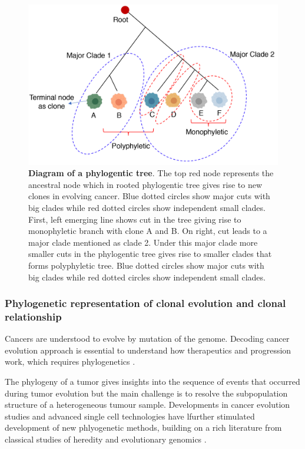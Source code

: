  \begin{figure}
\centering
\includegraphics[width=\textwidth]{Figures/chap1/phylogenetictree.png}
	\caption[Diagram of a phylogentic tree]
	{\small
	    \textbf{Diagram of a phylogentic tree}.
	 The top red node represents the ancestral node which in rooted phylogentic tree gives rise to new clones in evolving cancer.  Blue dotted circles show major cuts with big clades while red dotted circles show independent small clades. First, left emerging line shows cut in the tree giving rise to monophyletic branch with clone A and B. On right, cut leads to a major clade mentioned as clade 2. Under this major clade more smaller cuts in the phylogentic tree gives rise to smaller clades that forms polyphyletic tree. Blue dotted circles show major cuts with big clades while red dotted circles show independent small clades.
	}
	\label{fig:phylogentictree}
\end{figure}
 \subsubsection{Phylogenetic representation of clonal evolution and clonal relationship}
Cancers are understood to evolve by mutation of the genome. Decoding cancer evolution approach is  essential to understand how therapeutics and progression work, which requires phylogenetics \cite{burrell2013causes, tabassum2015tumorigenesis}. 

The phylogeny of a tumor gives insights into the sequence of events that occurred during tumor evolution but the main challenge is to resolve the subpopulation structure of a heterogeneous tumour sample. Developments in cancer evolution studies and advanced single cell technologies \cite{laks2019clonal} have lfurther  stimulated development of new phlyogenetic methods, building on a rich literature from classical studies of heredity and evolutionary genomics \cite{schwartz2017evolution}. 

